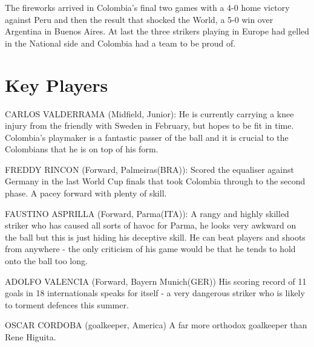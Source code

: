 The fireworks arrived in Colombia's final two games with a 4-0 home victory 
against Peru and then the result that shocked the World, a 5-0 win over 
Argentina in Buenos Aires. At last the three strikers playing in Europe had
gelled in the National side and Colombia had a team to be proud of.

\section{Key Players}
CARLOS VALDERRAMA (Midfield, Junior):
He is currently carrying a knee injury from the friendly with Sweden in 
February, but hopes to be fit in time. Colombia's playmaker is a fantastic 
passer of the ball and it is crucial to the Colombians that he is on top of his
form.

FREDDY RINCON (Forward, Palmeiras(BRA)):
Scored the equaliser against Germany in the last World Cup finals that took
Colombia through to the second phase. A pacey forward with plenty of skill.

FAUSTINO ASPRILLA (Forward, Parma(ITA)):
A rangy and highly skilled striker who has caused all sorts of havoc for Parma,
he looks very awkward on the ball but this is just hiding his deceptive skill. 
He can beat players and shoots from anywhere - the only criticism of his game
would be that he tends to hold onto the ball too long.

ADOLFO VALENCIA (Forward, Bayern Munich(GER))
His scoring record of 11 goals in 18 internationals speaks for itself - a very
dangerous striker who is likely to torment defences this summer.

OSCAR CORDOBA (goalkeeper, America)  
A far more orthodox goalkeeper than Rene Higuita.
